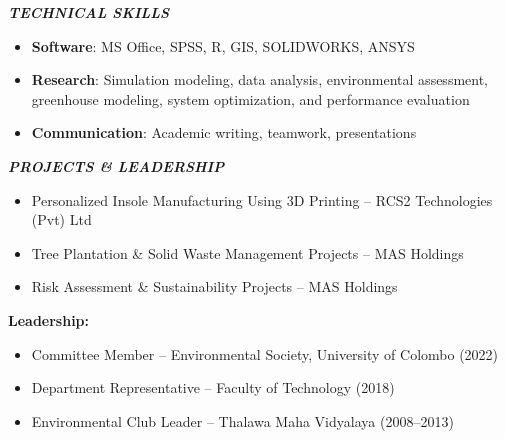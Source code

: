 \documentclass[10pt]{article}
\newcommand{\cvsection}[1]{%
  \vspace{8pt}%
  \begin{tcolorbox}[colback=headergray,colframe=headergray,arc=9pt,
      boxrule=0pt,left=10pt,right=10pt,top=3pt,bottom=3pt]
    \large\itshape\bfseries\MakeUppercase{#1}%
  \end{tcolorbox}%
  \vspace{2pt}%
}
\begin{document}
\cvsection{Technical Skills}
\begin{itemize}
  \item \textbf{Software}: MS Office, SPSS, R, GIS, SOLIDWORKS, ANSYS
  \item \textbf{Research}: Simulation modeling, data analysis, environmental assessment, greenhouse modeling,
        system optimization, and performance evaluation
  \item \textbf{Communication}: Academic writing, teamwork, presentations
\end{itemize}

\cvsection{Projects \& Leadership}
\begin{itemize}
  \item Personalized Insole Manufacturing Using 3D Printing -- RCS2 Technologies (Pvt) Ltd
  \item Tree Plantation \& Solid Waste Management Projects -- MAS Holdings
  \item Risk Assessment \& Sustainability Projects -- MAS Holdings
\end{itemize}

\vspace{6pt}
\textbf{Leadership:}
\begin{itemize}
  \item Committee Member -- Environmental Society, University of Colombo (2022)
  \item Department Representative -- Faculty of Technology (2018)
  \item Environmental Club Leader -- Thalawa Maha Vidyalaya (2008--2013)
\end{itemize}
\end{document}
